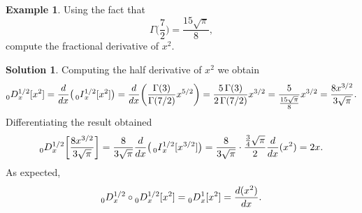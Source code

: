 \documentclass[12pt]{article}
\theoremstyle{definition}
\newtheorem*{example*}{Example}
\newtheorem*{solution*}{Solution}
\newcommand{\D}[2]{\prescript{}{#1}{D}_x^{#2}}
\newcommand{\I}[2]{\prescript{}{#1}{I}_x^{#2}}
\begin{document}
\begin{example*}
Using the fact that 
\[
\Gamma\bigg(\frac{7}{2}\bigg) = \frac{15\sqrt{\pi}}{8},
\]
compute the fractional derivative of $x^2$.
\end{example*}

\begin{solution*}
Computing the half derivative of $x^2$ we obtain
\[
\D{0}{1/2}[x^2] = \frac{d}{dx}\big(\I{0}{1/2}[x^2]\big) =
 \frac{d}{dx}\bigg(\frac{\Gamma(3)}{\Gamma(7/2)}x^{5/2}\bigg) 
= \frac{5\, \Gamma(3)}{2\, \Gamma(7/2)} x^{3/2} = \frac{5}{\frac{15\sqrt{\pi}}{8}} x^{3/2} = \frac{8 x^{3/2}}{3\sqrt{\pi}}.
\]
Differentiating the result obtained
\[
\D{0}{1/2}\bigg[\frac{8 x^{3/2}}{3\sqrt{\pi}}\bigg] = 
\frac{8}{3\sqrt{\pi}} \frac{d}{dx}\big(\I{0}{1/2}[x^{3/2}]\big)
=\frac{8}{3\sqrt{\pi}} \cdot \frac{\frac{3}{4}\sqrt{\pi}}{2} \frac{d}{dx}(x^2) = 2 x.
\]
As expected,
\[
\D{0}{1/2}\circ \D{0}{1/2}[x^2] = \D{0}{1}[x^2] = \frac{d(x^2)}{dx}.
\]
\end{solution*}
\end{document}
